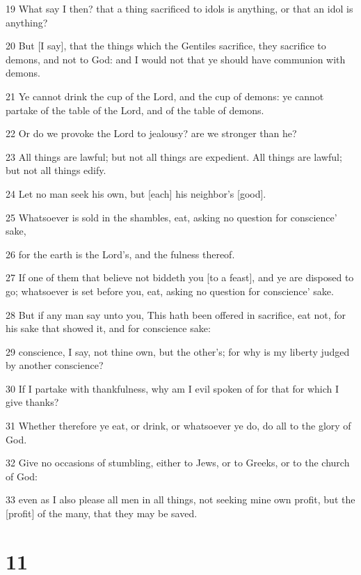 \par 19 What say I then? that a thing sacrificed to idols is anything, or that an idol is anything?
\par 20 But [I say], that the things which the Gentiles sacrifice, they sacrifice to demons, and not to God: and I would not that ye should have communion with demons.
\par 21 Ye cannot drink the cup of the Lord, and the cup of demons: ye cannot partake of the table of the Lord, and of the table of demons.
\par 22 Or do we provoke the Lord to jealousy? are we stronger than he?
\par 23 All things are lawful; but not all things are expedient. All things are lawful; but not all things edify.
\par 24 Let no man seek his own, but [each] his neighbor's [good].
\par 25 Whatsoever is sold in the shambles, eat, asking no question for conscience' sake,
\par 26 for the earth is the Lord's, and the fulness thereof.
\par 27 If one of them that believe not biddeth you [to a feast], and ye are disposed to go; whatsoever is set before you, eat, asking no question for conscience' sake.
\par 28 But if any man say unto you, This hath been offered in sacrifice, eat not, for his sake that showed it, and for conscience sake:
\par 29 conscience, I say, not thine own, but the other's; for why is my liberty judged by another conscience?
\par 30 If I partake with thankfulness, why am I evil spoken of for that for which I give thanks?
\par 31 Whether therefore ye eat, or drink, or whatsoever ye do, do all to the glory of God.
\par 32 Give no occasions of stumbling, either to Jews, or to Greeks, or to the church of God:
\par 33 even as I also please all men in all things, not seeking mine own profit, but the [profit] of the many, that they may be saved.

\chapter{11}

